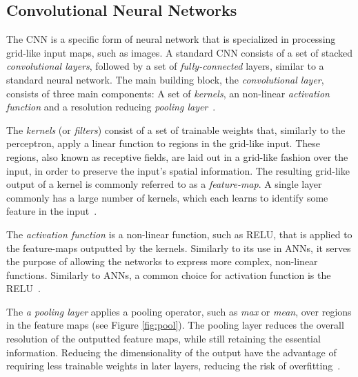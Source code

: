 \subsection{Convolutional Neural Networks}
The \gls{CNN} is a specific form of neural network that is specialized in processing grid-like input maps, such as images. A standard \gls{CNN} consists of a set of stacked \textit{convolutional layers}, followed by a set of \textit{fully-connected} layers, similar to a standard neural network. The main building block, the \textit{convolutional layer}, consists of three main components: A set of \textit{kernels}, an non-linear \textit{activation function} and a resolution reducing \textit{pooling layer}~\cite{deeplearningbook}.

The \textit{kernels} (or \textit{filters}) consist of a set of trainable weights that, similarly to the perceptron, apply a linear function to regions in the grid-like input. These regions, also known as receptive fields, are laid out in a grid-like fashion over the input, in order to preserve the input's spatial information. The resulting grid-like output of a kernel is commonly referred to as a \textit{feature-map}. A single layer commonly has a large number of kernels, which each learns to identify some feature in the input~\cite{deeplearningbook}.

The \textit{activation function} is a non-linear function, such as \gls{RELU}, that is applied to the feature-maps outputted by the kernels. Similarly to its use in ANNs, it serves the purpose of allowing the networks to express more complex, non-linear functions. Similarly to ANNs, a common choice for activation function is the \gls{RELU}~\cite{deeplearningbook}.

The \textit{a pooling layer} applies a pooling operator, such as \textit{max} or \textit{mean}, over regions in the feature maps (see Figure \ref{fig:pool}). The pooling layer reduces the overall resolution of the outputted feature maps, while still retaining the essential information. Reducing the dimensionality of the output have the advantage of requiring less trainable weights in later layers, reducing the risk of overfitting~\cite{deeplearningbook}.

